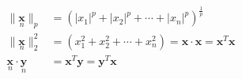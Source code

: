 \newcommand{\matrix}[1]{\mathbf{#1}}
\newcommand{\vector}[1]{\mathbf{#1}}
\begin{align*}
\|\underset{n}{\vector{x}}\|_p &= \left( |x_1|^p + |x_2|^p + \cdots + |x_n|^p \right)^\frac{1}{p} \\
\|\underset{n}{\vector{x}}\|_2^2 &= \left( x_1^2 + x_2^2 + \cdots + x_n^2 \right) = \vector{x} \cdot \vector{x} = \vector{x}^T\vector{x} \\
\underset{n}{\vector{x}} \cdot \underset{n}{\vector{y}} &= \vector{x}^T\vector{y} = \vector{y}^T\vector{x}
\end{align*}
